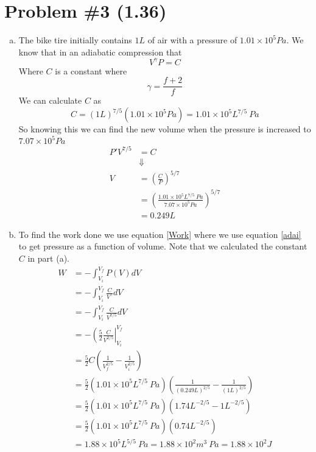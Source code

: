 \documentclass[11pt]{article}
\numberwithin{equation}{section}
\begin{document}
\section{Problem \#3 (1.36)}
\begin{enumerate}[(a)]
\item
The bike tire initially contains $1\unit{L}$ of air with a pressure of $1.01\times10^{5}\unit{Pa}$. We know that in an adiabatic compression that
\begin{equation}
V^{\gamma}P=C
\label{adai}
\end{equation}
Where $C$ is a constant where
$$\gamma = \frac{f+2}{f}$$
We can calculate $C$ as
$$C = (1\unit{L})^{7/5}(1.01\times10^{5}\unit{Pa}) = 1.01\times10^{5}\unit{L^{7/5}\ Pa}$$
So knowing this we can find the new volume when the pressure is increased to $7.07\times10^{5}\unit{Pa}$
\begin{align*}
P'V^{7/5} &= C\\
&\Downarrow\\
V &= \left(\frac{C}{P}\right)^{5/7}\\
&= \left(\frac{1.01\times10^{5}\unit{L^{7/5}\ Pa}}{7.07\times10^{5}\unit{Pa}}\right)^{5/7}\\
&= 0.249\unit{L}
\end{align*}

\item
To find the work done we use equation \ref{Work} where we use equation \ref{adai} to get pressure as a function of volume. Note that we calculated the constant $C$ in part (a).
\begin{align*}
W &= -\int_{V_i}^{V_f}P(V)dV\\
&= -\int_{V_i}^{V_f}\frac{C}{V^{\gamma}}dV\\
&= -\int_{V_i}^{V_f}\frac{C}{V^{7/5}}dV\\
&= -\left(\frac{5}{2}\frac{C}{V^{2/5}}\right|_{V_i}^{V_f}\\
&= \frac{5}{2}C\left(\frac{1}{V_f^{2/5}} - \frac{1}{V_i^{2/5}}\right)\\
&= \frac{5}{2}(1.01\times10^{5}\unit{L^{7/5}\ Pa})\left(\frac{1}{(0.249\unit{L})^{2/5}} - \frac{1}{(1\unit{L})^{2/5}}\right)\\
&= \frac{5}{2}(1.01\times10^{5}\unit{L^{7/5}\ Pa})\left(1.74\unit{L^{-2/5}} - 1\unit{L^{-2/5}}\right)\\
&= \frac{5}{2}(1.01\times10^{5}\unit{L^{7/5}\ Pa})\left(0.74\unit{L^{-2/5}}\right)\\
&= 1.88\times10^{5}\unit{L^{5/5}\ Pa} = 1.88\times10^{2}\unit{m^{3}\ Pa} = 1.88\times10^{2}\unit{J}
\end{align*}


\end{enumerate}
\end{document}
